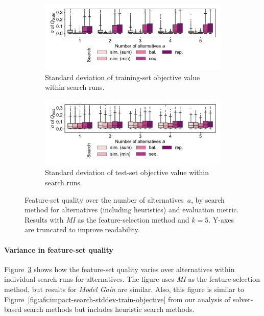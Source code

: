 \documentclass{article}
\theoremstyle{definition}
\begin{document}
\begin{figure}[t]
	\centering
	\begin{subfigure}[t]{\textwidth}
		\centering
		\includegraphics[width=\textwidth, trim=15 25 15 15, clip]{plots/afs-impact-search-heuristics-stddev-train-objective.pdf}
		\caption{Standard deviation of training-set objective value within search runs.}
		\label{fig:afs:impact-search-heuristics-stddev-train-objective}
	\end{subfigure}
	\begin{subfigure}[t]{\textwidth}
		\centering
		\includegraphics[width=\textwidth, trim=15 25 15 15, clip]{plots/afs-impact-search-heuristics-stddev-test-objective.pdf}
		\caption{Standard deviation of test-set objective value within search runs.}
		\label{fig:afs:impact-search-heuristics-stddev-test-objective}
	\end{subfigure}
	\caption{
		Feature-set quality over the number of alternatives~$a$, by search method for alternatives (including heuristics) and evaluation metric.
		Results with \emph{MI} as the feature-selection method and $k=5$.
		Y-axes are truncated to improve readability.
	}
	\label{fig:afs:impact-search-heuristics-stddev}
\end{figure}

\paragraph{Variance in feature-set quality}

Figure~\ref{fig:afs:impact-search-heuristics-stddev} shows how the feature-set quality varies over alternatives within individual search runs for alternatives.
The figure uses \emph{MI} as the feature-selection method, but results for \emph{Model Gain} are similar.
Also, this figure is similar to Figure~\ref{fig:afs:impact-search-stddev-train-objective} from our analysis of solver-based search methods but includes heuristic search methods.
\end{document}
